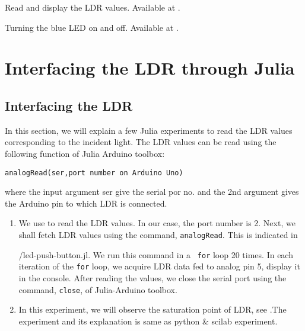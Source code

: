 \begin{pycode}
{Read and display the LDR values.  Available at
  .}
\label{py:ldr-read}

\end{pycode}

\begin{pycode}
{Turning the blue LED on and off.  Available at
  .}
\label{py:ldr-led}

\end{pycode}

\section{Interfacing the LDR through Julia}
\subsection{Interfacing the LDR}
In this section, we will explain a few Julia experiments to read the
LDR values corresponding to the incident light. The LDR values can be
read using the following function of Julia Arduino toolbox:
\begin{lstlisting}[style=nonumbers]
  analogRead(ser,port number on Arduino Uno)
\end{lstlisting}
where the input argument ser give the serial por no. and the 2nd argument gives the Arduino pin to which 
LDR is connected.

\begin{enumerate}
\item We use  to read the LDR values. In
  our case, the port number is 2. Next, we shall fetch LDR values
  using the command, {\tt analogRead}. This is indicated in 
  
  {\LocPushjuliacode/led-push-button.jl}. We run this command in a {\tt
    for} loop 20 times. In each iteration of the {\tt for} loop, we
  acquire LDR data fed to analog pin 5, display it in the console. 
  After reading the values, we close the serial port using the
  command, {\tt close}, of Julia-Arduino toolbox.

\item In this experiment, we will observe the saturation point of LDR,
  see .The experiment and its explanation is same 
  as python \& scilab experiment.
\end{enumerate}

